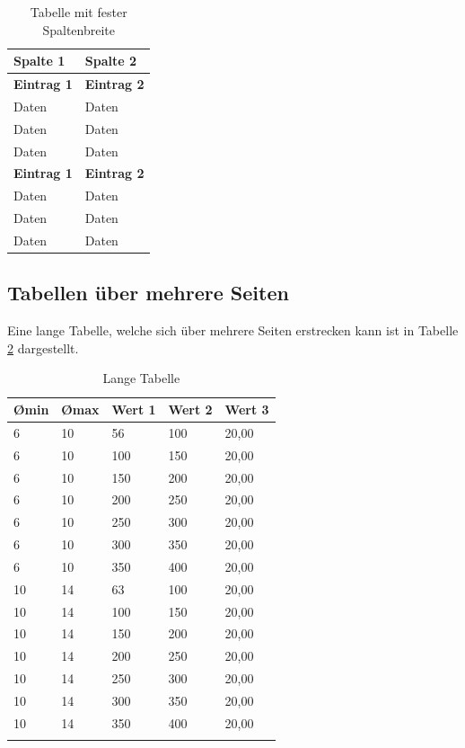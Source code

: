 \begin{table}[htbp]
\centering
\begin{tabular}{p{3.5cm} p{5.5cm}}
\toprule
\textbf{Spalte 1}  & \textbf{Spalte 2}\\
\midrule
\textbf{Eintrag 1} & \textbf{Eintrag 2}\\
Daten              & Daten\\
Daten              & Daten\\
Daten              & Daten\\
\midrule
\textbf{Eintrag 1} & \textbf{Eintrag 2}\\
Daten              & Daten\\
Daten              & Daten\\
Daten              & Daten\\
\bottomrule
\end{tabular}
\caption{Tabelle mit fester Spaltenbreite}
\label{tab:feste-breite}
\end{table}


\subsection{Tabellen über mehrere Seiten}

Eine lange Tabelle, welche sich über mehrere Seiten erstrecken kann ist in Tabelle \ref{tab:lange-tabelle} dargestellt.

\begin{longtable}{p{2cm} p{2cm} p{2cm} p{2cm} p{2cm}}
\toprule
\textbf{\O min}& \textbf{\O max}& \textbf{Wert 1}& \textbf{Wert 2}& \textbf{Wert 3}\\
\midrule
 6& 10&  56& 100& 20,00\\
 6& 10& 100& 150& 20,00\\
 6& 10& 150& 200& 20,00\\
 6& 10& 200& 250& 20,00\\
 6& 10& 250& 300& 20,00\\
 6& 10& 300& 350& 20,00\\
 6& 10& 350& 400& 20,00\\
10& 14&  63& 100& 20,00\\
10& 14& 100& 150& 20,00\\
10& 14& 150& 200& 20,00\\
10& 14& 200& 250& 20,00\\
10& 14& 250& 300& 20,00\\
10& 14& 300& 350& 20,00\\
10& 14& 350& 400& 20,00\\
\bottomrule
\caption{Lange Tabelle}
\label{tab:lange-tabelle}
\end{longtable}


